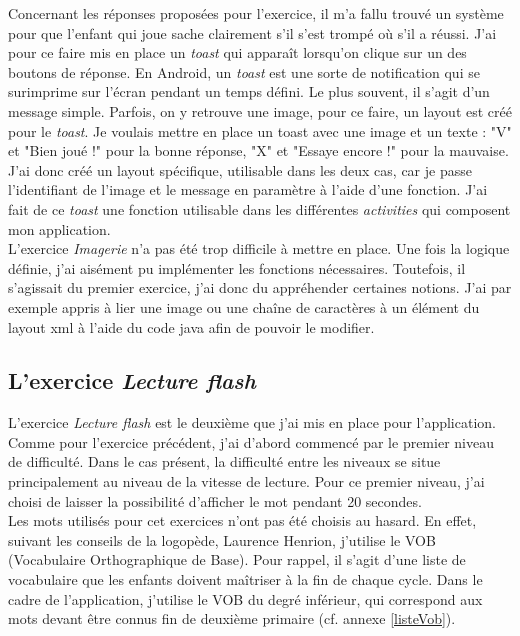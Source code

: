 Concernant les réponses proposées pour l'exercice, il m'a fallu trouvé un système pour que l'enfant qui joue sache clairement s'il s'est trompé où s'il a réussi. J'ai pour ce faire mis en place un \textit{toast} qui apparaît lorsqu'on clique sur un des boutons de réponse. En Android, un \textit{toast} est une sorte de notification qui se surimprime sur l'écran pendant un temps défini. Le plus souvent, il s'agit d'un message simple. Parfois, on y retrouve une image, pour ce faire, un layout est créé pour le \textit{toast}. Je voulais mettre en place un toast avec une image et un texte : "V" et "Bien joué !" pour la bonne réponse, "X" et "Essaye encore !" pour la mauvaise. J'ai donc créé un layout spécifique, utilisable dans les deux cas, car je passe l'identifiant de l'image et le message en paramètre à l'aide d'une fonction. J'ai fait de ce \textit{toast} une fonction utilisable dans les différentes \textit{activities} qui composent mon application.\\

L'exercice \textit{Imagerie} n'a pas été trop difficile à mettre en place. Une fois la logique définie, j'ai aisément pu implémenter les fonctions nécessaires. Toutefois, il s'agissait du premier exercice, j'ai donc du appréhender certaines notions. J'ai par exemple appris à lier une image ou une chaîne de caractères à un élément du layout xml à l'aide du code java afin de pouvoir le modifier.

\subsection{L'exercice \textit{Lecture flash}}
L'exercice \textit{Lecture flash} est le deuxième que j'ai mis en place pour l'application. Comme pour l'exercice précédent, j'ai d'abord commencé par le premier niveau de difficulté. Dans le cas présent, la difficulté entre les niveaux se situe principalement au niveau de la vitesse de lecture. Pour ce premier niveau, j'ai choisi de laisser la possibilité d'afficher le mot pendant 20 secondes.\\

Les mots utilisés pour cet exercices n'ont pas été choisis au hasard. En effet, suivant les conseils de la logopède, Laurence Henrion, j'utilise le VOB (Vocabulaire Orthographique de Base). Pour rappel, il s'agit d'une liste de vocabulaire que les enfants doivent maîtriser à la fin de chaque cycle. Dans le cadre de l'application, j'utilise le VOB du degré inférieur, qui correspond aux mots devant être connus fin de deuxième primaire (cf. annexe \ref{listeVob}).\\

